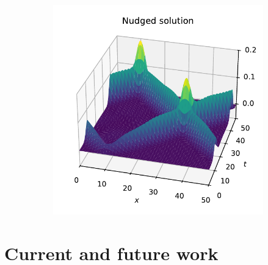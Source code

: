 \documentclass{beamer}
\begin{document}
\begin{frame}
\begin{figure}
\begin{subfigure}{0.42\textwidth}
      \includegraphics[width=\textwidth, keepaspectratio]{wave_1d_nudged.pdf}
    \end{subfigure}
  \end{figure}
\end{frame}

\section{Current and future work}
\end{document}
